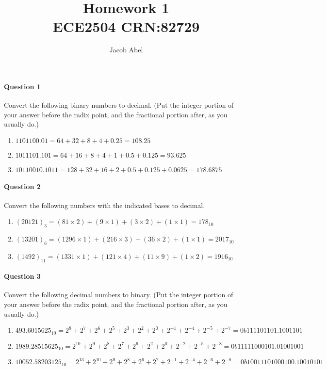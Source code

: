 \documentclass[12pt,letterpaper,notitlepage]{report}
\author{Jacob Abel}
\title{%
	Homework 1
	\\\large ECE2504 CRN:82729
}
\begin{document}
\maketitle
\paragraph{Question 1}
Convert the following binary numbers to decimal. (Put the integer portion of your answer before the radix point, and the fractional portion after, as you usually do.)
\begin{enumerate}[label=\alph*)]
\item $1101100.01    = 64+32+8+4+0.25 = 108.25$
\item $1011101.101   = 64+16+8+4+1+0.5+0.125 = 93.625$
\item $10110010.1011 = 128+32+16+2+0.5+0.125+0.0625 = 178.6875$
\end{enumerate}

\paragraph{Question 2}
Convert the following numbers with the indicated bases to decimal. 
\begin{enumerate}[label=\alph*)]
\item $(20121)_{3} = (81 \times 2) + (9 \times 1) + (3 \times 2) + (1 \times 1) = 178_{10}$
\item $(13201)_{6} = (1296 \times 1) + (216 \times 3) + (36 \times 2) + (1 \times 1) = 2017_{10}$
\item $(1492)_{11} = (1331 \times 1) + (121 \times 4) + (11 \times 9) + (1 \times 2) = 1916_{10}$
\end{enumerate}

\paragraph{Question 3} 
Convert the following decimal numbers to binary. (Put the integer portion of your answer before the radix point, and the fractional portion after, as you usually do.) 
\begin{enumerate}[label=\alph*)]
\item $493.6015625_{10} = 2^8+2^7+2^6+2^5+2^3+2^2+2^0+2^{-1}+2^{-4}+2^{-5}+2^{-7} = 0b111101101.1001101$
\item $1989.28515625_{10} = 2^{10}+2^9+2^8+2^7+2^6+2^2+2^0+2^{-2}+2^{-5}+2^{-8}= 0b11111000101.01001001$
\item $10052.58203125_{10} = 2^{13}+2^{10}+2^9+2^8+2^6+2^2+2^{-1}+2^{-4}+2^{-6}+2^{-8} = 0b10011101000100.10010101$
\end{enumerate}
\end{document}
